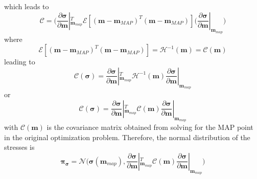 \documentclass[12pt]{article}
\newcommand{\mm}{{\ensuremath{\boldsymbol{m}}}}
\newcommand{\ppi}{{\ensuremath{\boldsymbol{\pi}}}}
\newcommand{\ssigma}{{\ensuremath{\boldsymbol{\sigma}}}}
\begin{document}
which leads to
\begin{equation}
\mathcal C = \big(\frac{\partial\ssigma}{\partial \mm}|_{\mm_{map}}^T \mathcal E[(\mm-\mm_{MAP})^T(\mm-\mm_{MAP})](\frac{\partial\ssigma}{\partial \mm}|_{\mm_{map}}\big)
\end{equation}
where 
\begin{equation}
  \mathcal E[(\mm-\mm_{MAP})^T(\mm-\mm_{MAP})] = \mathcal H^{-1}(\mm) = \mathcal C(\mm)
  \end{equation}
leading to
\begin{equation}
\mathcal C(\ssigma) = \frac{\partial\ssigma}{\partial \mm}|_{\mm_{map}}^T \mathcal H^{-1}(\mm)\frac{\partial\ssigma}{\partial \mm}|_{\mm_{map}}
\end{equation}
or 
\begin{equation}
\mathcal C(\ssigma) = \frac{\partial\ssigma}{\partial \mm}|_{\mm_{map}}^T \mathcal C(\mm)\frac{\partial\ssigma}{\partial \mm}|_{\mm_{map}}
\end{equation}
with $\mathcal C(\mm)$ is the covariance matrix obtained from solving for the MAP point in the original optimization problem. Therefore, the normal distribution of the stresses is
\begin{equation}
  \ppi_{\ssigma} = \mathcal N\big(\ssigma(\mm_{map}), \frac{\partial\ssigma}{\partial \mm}|_{\mm_{map}}^T \mathcal C(\mm)\frac{\partial\ssigma}{\partial \mm}|_{\mm_{map}}\big)
\end{equation}
\end{document}
